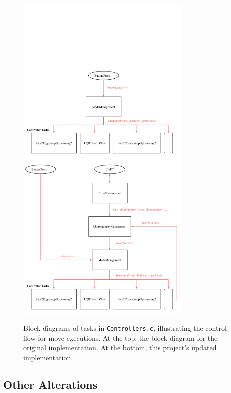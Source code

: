 \begin{figure}[ht]
    \includegraphics[width = 0.75\textwidth]{img/Controllers.png}
    \hrulefill
    \includegraphics[width = 0.75\textwidth]{img/ControllersChoreography.png}
  \caption{Block diagrams of tasks in \texttt{Controllers.c}, illustrating the control flow for move executions. At the top, the block diagram for the original implementation. At the bottom, this project's updated implementation.}
  \label{img:Controllers}
\end{figure}

\subsection{Other Alterations}

